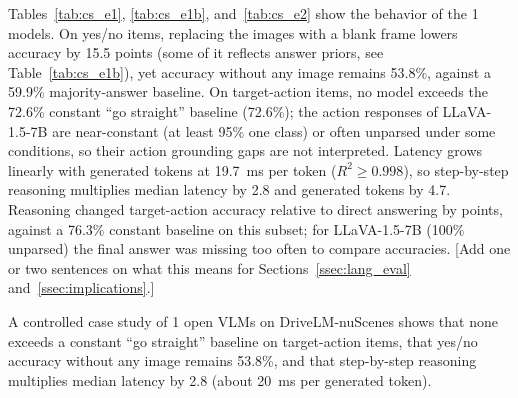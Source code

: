 Tables~\ref{tab:cs_e1}, \ref{tab:cs_e1b}, and~\ref{tab:cs_e2} show the behavior of the 1 models. On yes/no items, replacing the images with a blank frame lowers accuracy by 15.5 points (some of it reflects answer priors, see Table~\ref{tab:cs_e1b}), yet accuracy without any image remains 53.8\%, against a 59.9\% majority-answer baseline. On target-action items, no model exceeds the 72.6\% constant ``go straight'' baseline (72.6\%); the action responses of LLaVA-1.5-7B are near-constant (at least 95\% one class) or often unparsed under some conditions, so their action grounding gaps are not interpreted. Latency grows linearly with generated tokens at 19.7~ms per token ($R^2\ge0.998$), so step-by-step reasoning multiplies median latency by 2.8 and generated tokens by 4.7. Reasoning changed target-action accuracy relative to direct answering by  points, against a 76.3\% constant baseline on this subset; for LLaVA-1.5-7B (100\% unparsed) the final answer was missing too often to compare accuracies. [Add one or two sentences on what this means for Sections~\ref{ssec:lang_eval} and~\ref{ssec:implications}.]

A controlled case study of 1 open VLMs on DriveLM-nuScenes shows that none exceeds a constant ``go straight'' baseline on target-action items, that yes/no accuracy without any image remains 53.8\%, and that step-by-step reasoning multiplies median latency by 2.8 (about 20~ms per generated token).
